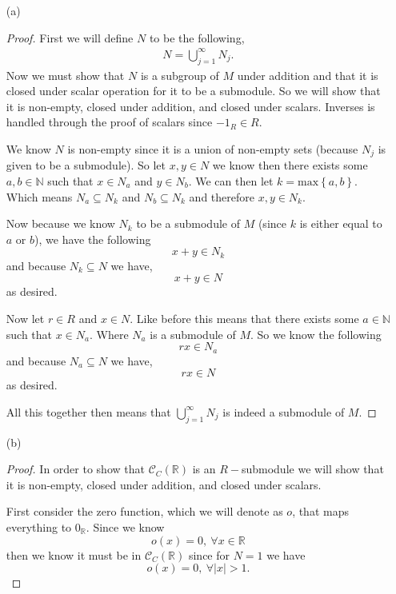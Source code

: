 \documentclass[11pt]{article}
\newcommand{\rr}{\mathbb R}   %
\newcommand{\nn}{\mathbb N}   %
\newcommand{\abs}[1]{\left\lvert#1\right\rvert} %
\newcommand{\set}[1]{\left\{#1\right\}} %
\begin{document}
\begin{itemize}
    \item [(a)]
    \begin{proof}
        First we will define $N$ to be the following,
        \begin{align*}
            N = \bigcup_{j =1}^{\infty}N_j.
        \end{align*}
        Now we must show that $N$ is a subgroup of $M$ under addition and that it is closed under scalar operation for it to be a submodule. So we will show that it is non-empty, closed under addition, and closed under scalars. Inverses is handled through the proof of scalars since $-1_R \in R$.

        We know $N$ is non-empty since it is a union of non-empty sets (because $N_j$ is given to be a submodule). So let $x,y \in N$ we know then there exists some $a, b \in \nn$ such that $x\in N_{a}$ and $y \in N_{b}$. We can then let $k = \text{max}\set{a,b}$. Which means $N_a \subseteq N_k$ and $N_b \subseteq N_k$ and therefore $x,y \in N_k$. 

        Now because we know $N_k$ to be a submodule of $M$ (since $k$ is either equal to $a$ or $b$), we have the following
        \[x + y \in N_k\]
        and because $N_k \subseteq N$ we have,
        \[x + y \in N\]
        as desired.

        Now let $r \in R$ and $x \in N$. Like before this means that there exists some $a \in \nn$ such that $x \in N_a$. Where $N_a$ is a submodule of $M$. So we know the following
        \[rx \in N_a\]
        and because $N_a \subseteq N$ we have,
        \[rx \in N\]
        as desired.

        All this together then means that $\bigcup_{j = 1}^{\infty}N_j$ is indeed a submodule of $M$.
    \end{proof}

    \item [(b)]
    \begin{proof}
        In order to show that $\mathcal{C}_C(\rr)$ is an $R-$submodule we will show that it is non-empty, closed under addition, and closed under scalars. 

        First consider the zero function, which we will denote as $o$, that maps everything to $0_\rr$. Since we know 
        \[o(x) = 0, \ \forall x \in \rr\]
        then we know it must be in $\mathcal{C}_C(\rr)$ since for $N = 1$ we have 
        \[o(x) = 0, \ \forall \abs{x} > 1.\]


\end{proof}
\end{itemize}
\end{document}
